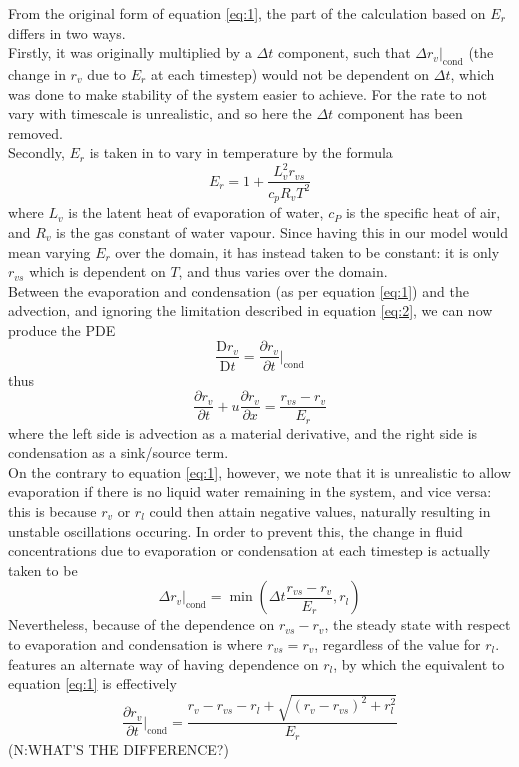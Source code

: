 \documentclass[11pt]{article}
\begin{document}
From the original form of equation \ref{eq:1}, the part of the calculation based on $E_r$ differs in two ways. \\
Firstly, it was originally multiplied by a $\Delta t$ component, such that $\Delta r_v|_{\text{cond}}$ (the change in $r_v$ due to $E_r$ at each timestep) would not be dependent on $\Delta t$, which was done to make stability of the system easier to achieve. For the rate to not vary with timescale is unrealistic, and so here the $\Delta t$ component has been removed. \\
Secondly, $E_r$ is taken in \citeauthor{BF2002} to vary in temperature by the formula
\begin{equation}
E_r = 1+\frac{L_v^2r_{vs}}{c_pR_vT^2} \label{eq:condrate}
\end{equation}
where 
$L_v$ is the latent heat of evaporation of water, 
$c_P$ is the specific heat of air, 
and $R_v$ is the gas constant of water vapour. 
Since having this in our model would mean varying $E_r$ over the domain, it has instead taken to be constant: it is only $r_{vs}$ which is dependent on $T$, and thus varies over the domain. \\
Between the evaporation and condensation (as per equation \ref{eq:1}) and the advection, and ignoring the limitation described in equation \ref{eq:2}, we can now produce the PDE
\[
\frac{\text{D} r_v}{\text{D} t}=\frac{\partial r_v}{\partial t}|_{\text{cond}}
\]
thus
\begin{equation}
\frac{\partial r_v}{\partial t}+u\frac{\partial r_v}{\partial x}=\frac{r_{vs} - r_v}{E_r} \label{eq:3}
\end{equation}
where the left side is advection as a material derivative, and the right side is condensation as a sink/source term. \\
On the contrary to equation \ref{eq:1}, however, we note that it is unrealistic to allow evaporation if there is no liquid water remaining in the system, and vice versa: this is because $r_v$ or $r_l$ could then attain negative values, naturally resulting in unstable oscillations occuring. In order to prevent this, the change in fluid concentrations due to evaporation or condensation at each timestep is actually taken to be
\begin{equation} \label{eq:2}
\Delta r_v|_{\text{cond}} = \min\left(\Delta t\frac{r_{vs} - r_v}{E_r},r_l\right)
\end{equation}
Nevertheless, because of the dependence on $r_{vs} - r_v$, the steady state with respect to evaporation and condensation is where $r_{vs}=r_v$, regardless of the value for $r_l$. \\
\citet[p.~324]{Jaehn2015} features an alternate way of having dependence on $r_l$, by which the equivalent to equation \ref{eq:1} is effectively
\[
\frac{\partial r_v}{\partial t}|_{\text{cond}} = \frac{r_v-r_{vs}-r_l+\sqrt{\left(r_v-r_{vs}\right)^2+r_l^2}}{E_r}
\]
(N:WHAT'S THE DIFFERENCE?)
\end{document}
